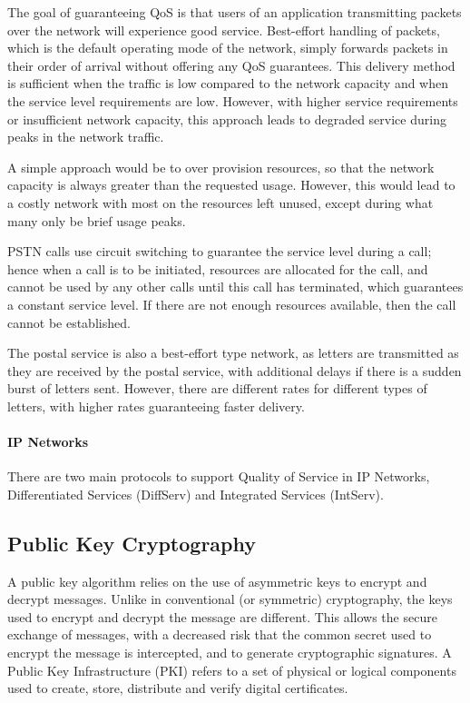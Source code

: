 The goal of guaranteeing QoS is that users of an application transmitting packets over the network will experience good service. Best-effort handling of packets, which is the default operating mode of the network, simply forwards packets in their order of arrival without offering any QoS guarantees. This delivery method is sufficient when the traffic is low compared to the network capacity and when the service level requirements are low. However, with higher service requirements or insufficient network capacity, this approach leads to degraded service during peaks in the network traffic.

A simple approach would be to over provision resources, so that the network capacity is always greater than the requested usage. However, this would lead to a costly network with most on the resources left unused, except during what many only be brief usage peaks.

PSTN calls use circuit switching to guarantee the service level during a call; hence when a call is to be initiated, resources are allocated for the call, and cannot be used by any other calls until this call has terminated, which guarantees a constant service level. If there are not enough resources available, then the call cannot be established.

The postal service is also a best-effort type network, as letters are transmitted as they are received by the postal service, with additional delays if there is a sudden burst of letters sent. However, there are different rates for different types of letters, with higher rates guaranteeing faster delivery.

\paragraph{IP Networks}
There are two main protocols to support Quality of Service in IP Networks, Differentiated Services (DiffServ)\cite{rfc2474} and Integrated Services (IntServ)\cite{rfc1633}.


\subsection{Public Key Cryptography}
A public key algorithm relies on the use of asymmetric keys to encrypt and decrypt messages. Unlike in conventional (or symmetric) cryptography, the keys used to encrypt and decrypt the message are different. This allows the secure exchange of messages, with a decreased risk that the common secret used to encrypt the message is intercepted, and to generate cryptographic signatures. A Public Key Infrastructure (PKI) refers to a set of physical or logical components used to create, store, distribute and verify digital certificates\cite{stallings_cryptography_2014}.

